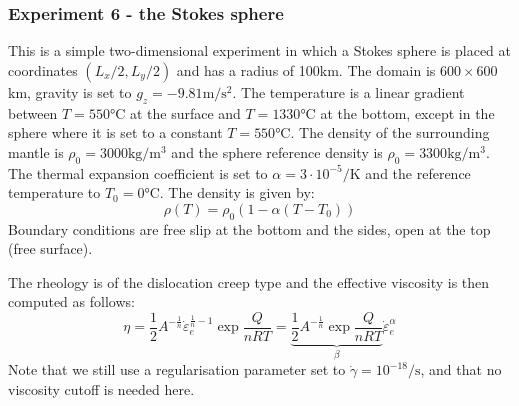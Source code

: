 \newpage
\subsubsection*{Experiment 6 - the Stokes sphere}

This is a simple two-dimensional experiment in which a Stokes sphere is placed at coordinates 
$(L_x/2,L_y/2)$ and has a radius of 100\si{\kilo\metre}. 
The domain is $600\times600$\si{\kilo\metre}, 
gravity is set to $g_z=-9.81\si{\metre\per\square\second}$.
The temperature is a linear gradient between  $T=550\si{\celsius}$ 
at the surface and $T=1330\si{\celsius}$ at the bottom,
except in the sphere where it is set to a constant $T=550\si{\celsius}$.
The density of the surrounding mantle is $\rho_0=3000\si{\kilogram\per\cubic\meter}$ 
and the sphere reference density is $\rho_0=3300\si{\kilogram\per\cubic\meter}$. The thermal expansion 
coefficient is set to $\alpha=3\cdot 10^{-5} \si{\per\kelvin}$ and the reference temperature to $T_0=0\si{\celsius}$.
The density is given by: 
\[
\rho(T)=\rho_0(1-\alpha(T-T_0))
\]
Boundary conditions are free slip at the bottom and the sides, open at the top (free surface).

The rheology is of the dislocation creep type and the effective viscosity is then computed as follows:
\[
\eta 
= \frac{1}{2} A^{-\frac1n} \dot\varepsilon_e^{\frac1n-1}  \exp \frac{Q}{nRT} 
= \underbrace{ \frac{1}{2} A^{-\frac1n} \exp \frac{Q}{nRT} }_{\beta} \dot\varepsilon_e^{\alpha}  
\]
Note that we still use a regularisation parameter set to $\dot\gamma=10^{-18}\si{\per\second}$, 
and that no viscosity cutoff is needed here. 


